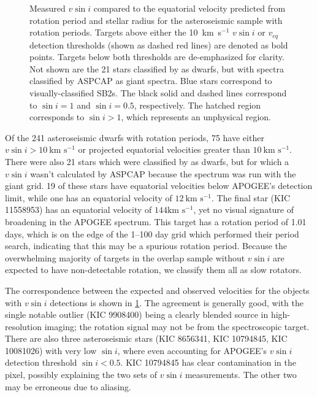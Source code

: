 \documentclass[preprint2]{aastex62}
\newcommand{\vsini}{\ensuremath{v \sin i}}
\newcommand{\kms}{\textrm{km~s}\ensuremath{^{-1}}}
\begin{document}
\begin{figure}[htb]
    \centering
    \caption{Measured \vsini{} compared to the equatorial velocity
        predicted from rotation period and stellar radius for the asteroseismic
    sample with \citet{Garcia14} rotation periods. Targets above either the
    10~\kms{} \vsini{} or \(v_{eq}\) detection thresholds (shown as dashed red 
    lines) are denoted as bold points. Targets below both thresholds are
    de-emphasized for clarity. Not shown are the 21 stars classified by \citet{Serenelli17} as dwarfs, but with spectra classified by ASPCAP as giant spectra. Blue stars correspond to visually-classified 
    SB2s. The black solid and dashed lines correspond to \(\sin i = 1\) and 
    \(\sin i = 0.5\), respectively. The hatched region corresponds to 
    \(\sin i > 1\), which represents an unphysical region.}
    \label{fig:apokasc_vdists}
\end{figure}

Of the 241 asteroseismic dwarfs with \citet{Garcia14} rotation 
periods, 75 have either \(\vsini > 10~\kms\) or projected equatorial velocities 
greater than \(10~\kms\). There were also 21 stars which were classified by \citet{Serenelli17} as dwarfs, but for which a \vsini{} wasn't calculated by ASPCAP because the spectrum was run with the giant grid. 19 of these stars have equatorial velocities below APOGEE's detection limit, while one has an equatorial velocity of \(12~\kms\). The final star (KIC 11558953) has an equatorial velocity of \(144 \kms\), yet no visual signature of broadening in the APOGEE spectrum. This target has a rotation period of 1.01 days, which is on the edge of the 1--100 day grid which \citet{Garcia14} performed their period search, indicating that this may be a spurious rotation period. Because the overwhelming majority of targets in the \citet{Garcia14} overlap sample without \vsini{} are expected to have non-detectable rotation, we classify them all as slow rotators.

The correspondence between the expected and observed 
velocities for the objects 
with \vsini{} detections is shown in \cref{fig:apokasc_vdists}. The agreement
is generally good, with the single notable outlier (KIC 9908400) being a
clearly blended source in high-resolution imaging; the rotation signal may not
be from the spectroscopic target. There are also three asteroseismic stars (KIC 8656341, KIC 10794845, KIC 10081026) with very low \(\sin i\), where even accounting for APOGEE's \vsini{} detection threshold \(\sin i < 0.5\). KIC 10794845 has clear contamination in the pixel, possibly explaining the two sets of \vsini{} measurements. The other two may be erroneous due to aliasing.
\end{document}
